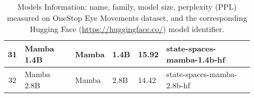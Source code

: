 \begin{table}[ht!]
\begin{tabular}{|c|l|l|l|l|l|}
31 & Mamba 1.4B                  & Mamba                & 1.4B                & 15.92        & state-spaces-mamba-1.4b-hf \\ \hline
32 & Mamba 2.8B                  & Mamba                & 2.8B                & 14.42        & state-spaces-mamba-2.8b-hf \\ \hline
\end{tabular}
\caption{Models Information: name, family, model size, perplexity (PPL) measured on OneStop Eye Movements dataset, and the corresponding Hugging Face (\url{https://huggingface.co/}) model identifier.}
\label{tab:models_table}
\end{table}
